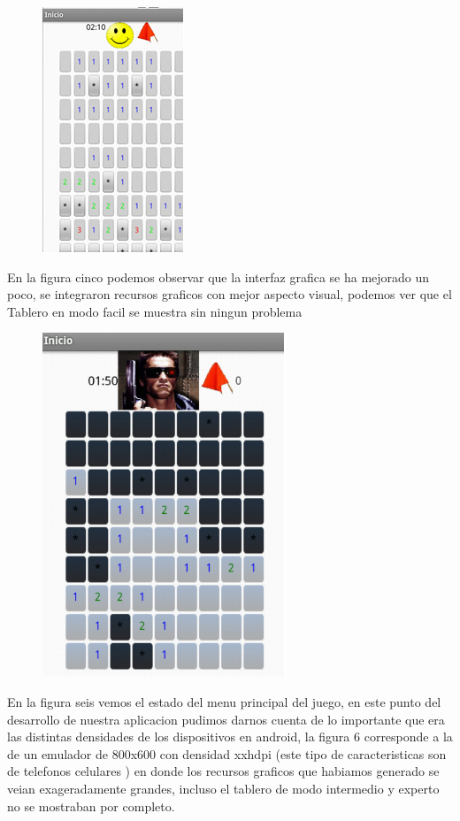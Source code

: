 \documentclass[11pt]{article} %
\begin{document}
\begin{figure}[H]
 \begin{center}
    \includegraphics{imagenes_Documentacion/AvanceUno}
\end{center}
\caption {}
\label{Avance Uno}
\end{figure}

En la figura cinco podemos observar que la interfaz grafica se ha mejorado un poco, se integraron recursos graficos con mejor aspecto visual, podemos ver que el Tablero en modo facil se muestra sin ningun problema
\begin{figure}[H]
 \begin{center}
    \includegraphics{imagenes_Documentacion/AvanceDos}
\end{center}
\caption {}
\label{Avance Dos}
\end{figure}

En la figura seis vemos el estado del menu principal del juego, en este punto del desarrollo de nuestra aplicacion pudimos darnos cuenta de lo importante que era las distintas densidades de los dispositivos en android, la figura 6 corresponde a la de un emulador de 800x600 con densidad xxhdpi (este tipo de caracteristicas son de telefonos celulares ) en donde los recursos graficos que habiamos generado se veian exageradamente grandes, incluso el tablero de modo intermedio y experto no se mostraban por completo.
\end{document}
